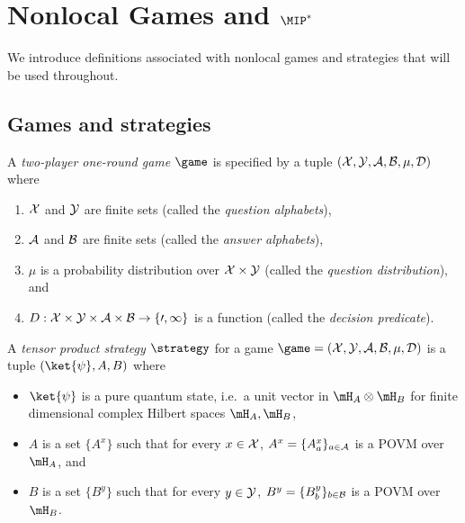 \section{Nonlocal Games and $\MIP^*$}
\label{sec:games}

We introduce definitions associated with nonlocal games and strategies that will
be used throughout.

\subsection{Games and strategies}
\label{sec:strat}

\begin{definition}
  \label{def:game}
  A \emph{two-player one-round game} $\game$ is specified by a tuple
  $(\cal{X}, \cal{Y}, \cal{A}, \cal{B}, \mu, D)$ where
  \begin{enumerate}
  \item $\cal{X}$ and $\cal{Y}$ are finite sets (called the \emph{question
      alphabets}),
  \item $\cal{A}$ and $\cal{B}$ are finite sets (called the \emph{answer
      alphabets}),
  \item $\mu$ is a probability distribution over $\cal{X} \times \cal{Y}$
    (called the \emph{question distribution}), and
  \item $D: \cal{X} \times \cal{Y} \times \cal{A} \times \cal{B} \to \{0,1\}$ is
    a function (called the \emph{decision predicate}).
  \end{enumerate}
\end{definition}

\begin{definition}
  \label{def:tensor-product-strategy}
  A \emph{tensor product strategy} $\strategy$ for a game $\game = (\cal{X},
  \cal{Y}, \cal{A}, \cal{B}, \mu, D)$ is a tuple $(\ket{\psi}, A, B)$ where
  \begin{itemize}
	\item $\ket{\psi}$ is a pure quantum state, i.e.\ a unit vector in $\mH_A \otimes \mH_B$ for finite
    dimensional complex Hilbert spaces $\mH_A, \mH_B$,
	\item $A$ is a set $\{A^x\}$ such that for every $x \in \cal{X}$, $A^x =
    \{A^x_a \}_{a \in \cal{A}}$ is a POVM over $\mH_A$, and
	\item $B$ is a set $\{B^y\}$ such that for every $y \in \cal{Y}$, $B^y =
    \{B^y_b \}_{b \in \cal{B}}$ is a POVM over $\mH_B$.
\end{itemize}
\end{definition}

